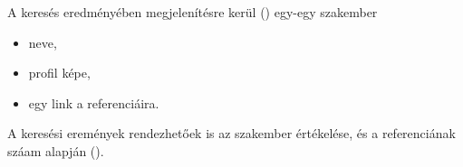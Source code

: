 A keresés eredményében megjelenítésre kerül () egy-egy szakember
\begin{itemize}
     \item neve,
     \item profil képe,
     \item egy link a referenciáira.
\end{itemize}
A keresési eremények rendezhetőek is az szakember értékelése, és a referenciának száam alapján ().